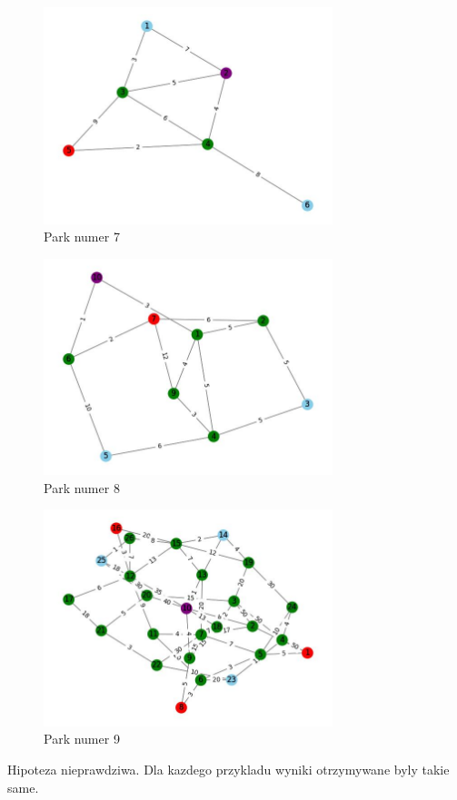 \documentclass{article}
\begin{document}
\begin{figure}[h!]
\centering
\includegraphics[width=0.75\textwidth]{7.jpg}
\caption{Park numer 7}
\end{figure}
\begin{figure}[h!]
\centering
\includegraphics[width=0.75\textwidth]{8.jpg}
\caption{Park numer 8}
\end{figure}
\begin{figure}[h!]
\centering
\includegraphics[width=0.75\textwidth]{9.jpg}
\caption{Park numer 9}
\end{figure}
Hipoteza nieprawdziwa. Dla kazdego przykladu wyniki otrzymywane byly takie same.
\end{document}
